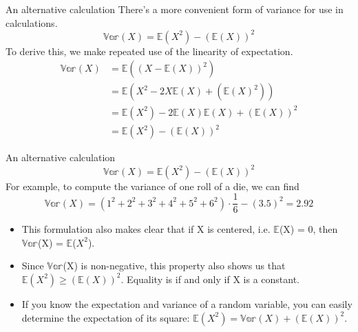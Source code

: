 \documentclass[aspectratio=169]{../latex_main/tntbeamer}  %
\begin{document}
	
	\begin{frame}[c]{An alternative calculation}
	    There’s a more convenient form of variance for use in calculations.
	    \begin{equation*}
	        \mathbb{Var}(X) = \mathbb{E}(X^2) - (\mathbb{E}(X))^2
	    \end{equation*}
	    To derive this, we make repeated use of the linearity of expectation.
	    \begin{align*}
	        \mathbb{Var}(X) &= \mathbb{E}((X-\mathbb{E}(X))^2)\\
	        &=  \mathbb{E}(X^2-2X\mathbb{E}(X) + (\mathbb{E}(X)^2))\\
	        &= \mathbb{E}(X^2) - 2\mathbb{E}(X)\mathbb{E}(X) + (\mathbb{E}(X))^2\\
	        &= \mathbb{E}(X^2) - (\mathbb{E}(X))^2
	    \end{align*}
	\end{frame}
	
	
	
	\begin{frame}[c]{An alternative calculation}
	    \begin{equation*}
	        \mathbb{Var}(X) = \mathbb{E}(X^2) - (\mathbb{E}(X))^2
	    \end{equation*}
	    For example, to compute the variance of one roll of a die, we can find
	    \begin{equation*}
	        \mathbb{Var}(X) = (1^2+2^2+3^2+4^2+5^2+6^2)\cdot \frac{1}{6}-(3.5)^2 = 2.92
	    \end{equation*}
	    
	    \begin{itemize}
	        \item This formulation also makes clear that if X is centered, i.e. $\mathbb{E}$(X) = 0, then $\mathbb{Var}$(X) = $\mathbb{E}$($X^2$).
	        \item Since $\mathbb{Var}$(X) is non-negative, this property also shows us that                   $\mathbb{E}(X^2) \geq (\mathbb{E}(X))^2$.      Equality is if and only if X is a constant.
	        \item If you know the expectation and variance of a random variable, you can easily determine the expectation of its square:   $\mathbb{E}(X^2) = \mathbb{Var}(X) + (\mathbb{E}(X))^2$. 
	    \end{itemize}
	\end{frame}
	
\end{document}
